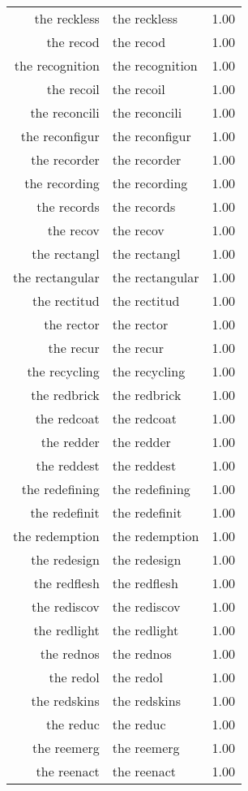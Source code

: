 \begin{table}[ht]
\begin{tabular}{rlr}
  the reckless & the reckless & 1.00 \\ 
  the recod & the recod & 1.00 \\ 
  the recognition & the recognition & 1.00 \\ 
  the recoil & the recoil & 1.00 \\ 
  the reconcili & the reconcili & 1.00 \\ 
  the reconfigur & the reconfigur & 1.00 \\ 
  the recorder & the recorder & 1.00 \\ 
  the recording & the recording & 1.00 \\ 
  the records & the records & 1.00 \\ 
  the recov & the recov & 1.00 \\ 
  the rectangl & the rectangl & 1.00 \\ 
  the rectangular & the rectangular & 1.00 \\ 
  the rectitud & the rectitud & 1.00 \\ 
  the rector & the rector & 1.00 \\ 
  the recur & the recur & 1.00 \\ 
  the recycling & the recycling & 1.00 \\ 
  the redbrick & the redbrick & 1.00 \\ 
  the redcoat & the redcoat & 1.00 \\ 
  the redder & the redder & 1.00 \\ 
  the reddest & the reddest & 1.00 \\ 
  the redefining & the redefining & 1.00 \\ 
  the redefinit & the redefinit & 1.00 \\ 
  the redemption & the redemption & 1.00 \\ 
  the redesign & the redesign & 1.00 \\ 
  the redflesh & the redflesh & 1.00 \\ 
  the rediscov & the rediscov & 1.00 \\ 
  the redlight & the redlight & 1.00 \\ 
  the rednos & the rednos & 1.00 \\ 
  the redol & the redol & 1.00 \\ 
  the redskins & the redskins & 1.00 \\ 
  the reduc & the reduc & 1.00 \\ 
  the reemerg & the reemerg & 1.00 \\ 
  the reenact & the reenact & 1.00 \\ 

\end{tabular}
\end{table}
